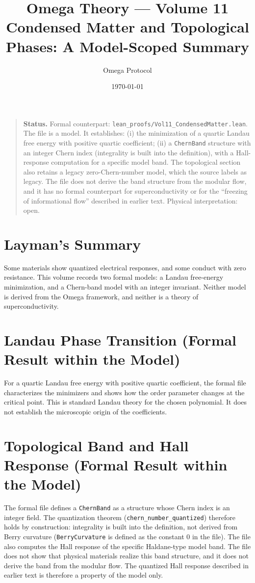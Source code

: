 \documentclass[11pt, a4paper]{article}
\title{Omega Theory --- Volume 11\\\Large Condensed Matter and Topological Phases: A Model-Scoped Summary}
\author{Omega Protocol}
\date{\today}
\begin{document}
\maketitle

\begin{quote}
\textbf{Status.} Formal counterpart: \texttt{lean\_proofs/Vol11\_CondensedMatter.lean}. The file is a model. It establishes: (i) the minimization of a quartic Landau free energy with positive quartic coefficient; (ii) a \texttt{ChernBand} structure with an integer Chern index (integrality is built into the definition), with a Hall-response computation for a specific model band. The topological section also retains a legacy zero-Chern-number model, which the source labels as legacy. The file does not derive the band structure from the modular flow, and it has no formal counterpart for superconductivity or for the ``freezing of informational flow'' described in earlier text. Physical interpretation: open.
\end{quote}

\section*{Layman's Summary}
Some materials show quantized electrical responses, and some conduct with zero resistance. This volume records two formal models: a Landau free-energy minimization, and a Chern-band model with an integer invariant. Neither model is derived from the Omega framework, and neither is a theory of superconductivity.

\section{Landau Phase Transition (Formal Result within the Model)}
For a quartic Landau free energy with positive quartic coefficient, the formal file characterizes the minimizers and shows how the order parameter changes at the critical point. This is standard Landau theory for the chosen polynomial. It does not establish the microscopic origin of the coefficients.

\section{Topological Band and Hall Response (Formal Result within the Model)}
The formal file defines a \texttt{ChernBand} as a structure whose Chern index is an integer field. The quantization theorem (\texttt{chern\_number\_quantized}) therefore holds by construction: integrality is built into the definition, not derived from Berry curvature (\texttt{BerryCurvature} is defined as the constant $0$ in the file). The file also computes the Hall response of the specific Haldane-type model band. The file does not show that physical materials realize this band structure, and it does not derive the band from the modular flow. The quantized Hall response described in earlier text is therefore a property of the model only.
\end{document}
